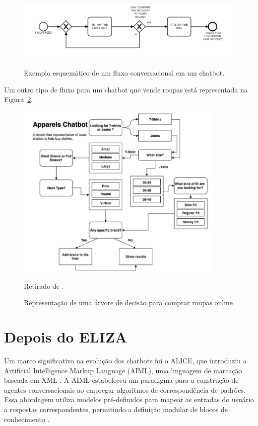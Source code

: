 \documentclass[14pt,a4paper,oneside]{book}
\begin{document}
\begin{figure}
	\centering
	\caption{Exemplo esquemático de um fluxo conversacional em um chatbot.}
	\includegraphics[width=1\linewidth]{./fig/fluxo.png}
	\label{fig:fluxo}
\end{figure}

Um outro tipo de fluxo para um chatbot que vende roupas está representada na Figura~\ref{fig:representacaodeumaarvore}.

\begin{figure}
\caption{Representação de uma árvore de decisão para comprar roupas online}
\vspace{0.5cm}
    \centering
   	\vspace*{0,2cm}
    \includegraphics[width=0.9\textwidth]{./fig/image14.png}
    \label{fig:representacaodeumaarvore}
	{
	
	Retirado de \cite{Raj2019}.}
\end{figure}

\section{Depois do ELIZA}

Um marco significativo na evolução dos chatbots foi o ALICE, que introduziu a Artificial Intelligence Markup Language (AIML), uma linguagem de marcação baseada em XML \cite{Wallace2000}. A AIML estabeleceu um paradigma para a construção de agentes conversacionais ao empregar algoritmos de correspondência de padrões. Essa abordagem utiliza modelos pré-definidos para mapear as entradas do usuário a respostas correspondentes, permitindo a definição modular de blocos de conhecimento \cite{Wallace2000}.
\end{document}
